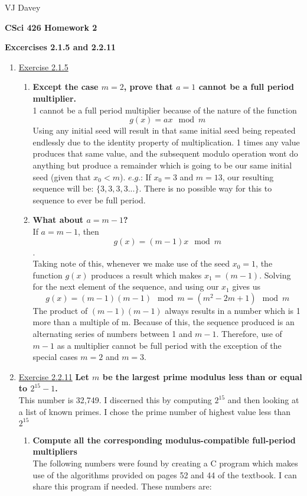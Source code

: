\documentclass[11pt]{article}
\begin{document}
\centerline{VJ Davey}\vskip 0.10cm
\begin{LARGE}
\centerline {\bf CSci 426 Homework 2}
\end{LARGE}
\vskip 0.25cm
\centerline{\bf Excercises 2.1.5 and 2.2.11}
\begin{enumerate}
	\item \underline{Exercise 2.1.5}
		\begin{enumerate}
			\item\textbf{ Except the case $m = 2$, prove that $a = 1$ cannot be a full period multiplier.}
				\\1 cannot be a full period multiplier because of the nature of the function $$g(x) = a x\mod{m}$$ Using any initial seed will result in that same initial seed being repeated endlessly due to the identity property of multiplication. 1 times any value produces that same value, and the subsequent modulo operation wont do anything but produce a remainder which is going to be our same initial seed (given that $x_0 < m$). $e.g.$: If $x_0 = 3$ and $m = 13$, our resulting sequence will be: $\{3,3,3,3...\}$. There is no possible way for this to sequence to ever be full period.
			\item\textbf{ What about $a = m - 1$?}
				\\If $a = m -1$, then $$g(x) = (m-1)x\mod{m}$$. 
				\\Taking note of this, whenever we make use of the seed $x_0 = 1$, the function $g(x)$ produces a result which makes $x_1 = (m-1)$. Solving for the next element of the sequence, and using our $x_1$ gives us $$g(x) = (m-1)(m-1)\mod{m} = (m^2 - 2m + 1)\mod{m}$$ 
				The product of $(m-1)(m-1)$ always results in a number which is 1 more than a multiple of m. Because of this, the sequence produced is an alternating series of numbers between 1 and $m-1$. Therefore, use of $m-1$ as a multiplier cannot be full period with the exception of the special cases $m=2$ and $m=3$.		
		\end{enumerate}
	\item\underline{Exercise 2.2.11}
		\textbf{Let $m$ be the largest prime modulus less than or equal to $2^{15} -1$. }
		\\This number is 32,749. I discerned this by computing $2^{15}$ and then looking at a list of known primes. I chose the prime number of highest value less than $2^{15}$
		\begin{enumerate}
			\item\textbf{ Compute all the corresponding modulus-compatible full-period multipliers}
			\\The following numbers were found by creating a C program which makes use of the algorithms provided on pages 52 and 44 of the textbook. I can share this program if needed. These numbers are: 
			

\end{enumerate}
\end{enumerate}
\end{document}
